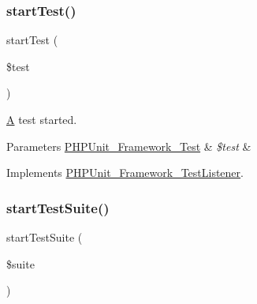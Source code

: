 \mbox{\label{class_framework___test_listener_test_a1a9bddc54f26bb3fb5c2ec9778ea5198}} 
\subsubsection{\texorpdfstring{start\+Test()}{startTest()}}
{\footnotesize\ttfamily start\+Test (\begin{DoxyParamCaption}\item[{\mbox{\hyperlink{interface_p_h_p_unit___framework___test}{P\+H\+P\+Unit\+\_\+\+Framework\+\_\+\+Test}}}]{\$test }\end{DoxyParamCaption})}

\mbox{\hyperlink{class_a}{A}} test started.


\begin{DoxyParams}[1]{Parameters}
\mbox{\hyperlink{interface_p_h_p_unit___framework___test}{P\+H\+P\+Unit\+\_\+\+Framework\+\_\+\+Test}} & {\em \$test} & \\
\hline
\end{DoxyParams}


Implements \mbox{\hyperlink{interface_p_h_p_unit___framework___test_listener_a1a9bddc54f26bb3fb5c2ec9778ea5198}{P\+H\+P\+Unit\+\_\+\+Framework\+\_\+\+Test\+Listener}}.

\mbox{\label{class_framework___test_listener_test_a901a86a623d83184267b21f2daee0ff5}} 
\subsubsection{\texorpdfstring{start\+Test\+Suite()}{startTestSuite()}}
{\footnotesize\ttfamily start\+Test\+Suite (\begin{DoxyParamCaption}\item[{\mbox{\hyperlink{class_p_h_p_unit___framework___test_suite}{P\+H\+P\+Unit\+\_\+\+Framework\+\_\+\+Test\+Suite}}}]{\$suite }\end{DoxyParamCaption})}

